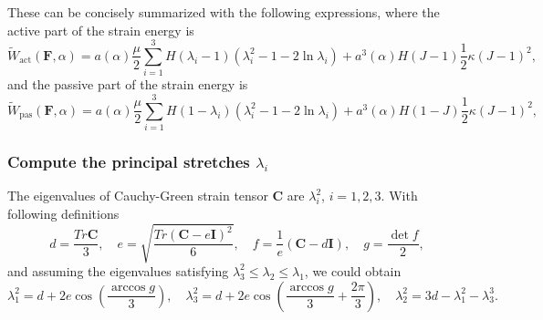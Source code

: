\documentclass[12pt,3p]{article}
\numberwithin{equation}{section}
\begin{document}
These can be concisely summarized with the following expressions, where the active part of the strain energy is
\begin{equation}
\widetilde{W}_\text{act}\left(\mathbf{F},\alpha\right)=a(\alpha)\frac{\mu}{2}\sum_{i=1}^{3}H(\lambda_i-1)\left(\lambda_i^2-1-2\ln\lambda_i\right) + a^3(\alpha)H(J-1)\frac{1}{2}\kappa\left(J-1\right)^2,
\end{equation}
and the passive part of the strain energy is
\begin{equation}
\widetilde{W}_\text{pas}\left(\mathbf{F},\alpha\right)=a(\alpha)\frac{\mu}{2}\sum_{i=1}^{3}H(1-\lambda_i)\left(\lambda_i^2-1-2\ln\lambda_i\right) + a^3(\alpha)H(1-J)\frac{1}{2}\kappa\left(J-1\right)^2,
\end{equation}

\subsubsection{Compute the principal stretches $\lambda_i$} 
The eigenvalues of Cauchy-Green strain tensor $\mathbf{C}$ are $\lambda_i^2$, $i=1,2,3$.
With following definitions 
\begin{equation}
d=\frac{ Tr {\mathbf{C}}}{3},\quad e= \sqrt{\frac{ Tr { (\mathbf{C}-e\mathbf{I} )^2}}{6}},\quad
f=\frac{1}{e}\left(\mathbf{C}-d\mathbf{I}\right),\quad g=\frac{\det{f}}{2},
\end{equation}
and assuming the eigenvalues satisfying $\lambda_3^2\le\lambda_2\le\lambda_1$, we could obtain \citep{smith1961eigenvalues}
\begin{equation}
\lambda_1^2 = d +2e\cos\left(\frac{\arccos g}{3}\right), \quad \lambda_3^2 = d +2e\cos\left(\frac{\arccos g}{3}+\frac{2\pi}{3}\right), \quad \lambda_2^2 = 3d -\lambda_1^2 -\lambda_3^3.
\end{equation}


\end{document}
